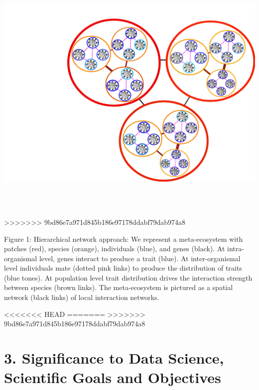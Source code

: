 \documentclass[12pt]{article}
\begin{document}
\begin{center}
\begin{center}
\hspace{-2 in}\includegraphics[width=17cm,height=13cm]{Figure1.pdf}
>>>>>>> 9bd86e7a971d845b186e97178ddabf79dab974a8
\caption{{\small Figure 1: Hierarchical network approach: We represent a meta-ecosystem
  with patches (red), species (orange), individuals (blue), and genes
  (black). At intra-organismal level, genes interact to produce a
  trait (blue). At inter-organismal level individuals mate (dotted
  pink links) to produce the distribution of traits (blue tones). At
  population level trait distribution drives the interaction strength
  between species (brown links). The meta-ecosystem is pictured as a
  spatial network (black links) of local interaction networks.}}
\vspace{2 in}
\label{Figure 1}
\end{center}
<<<<<<< HEAD
\vspace{-1 in}
=======
\vspace{-4 in}
>>>>>>> 9bd86e7a971d845b186e97178ddabf79dab974a8

\section*{3. Significance to Data Science, Scientific Goals and Objectives}


\end{center}
\end{document}
